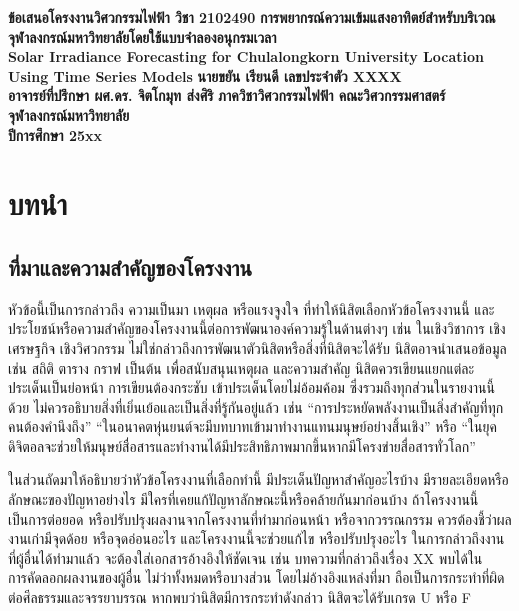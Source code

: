 \documentclass[11pt,a4paper]{article}
\begin{document}
\thispagestyle{empty}
\begin{center}
\doublespacing
{\LARGE \bf ข้อเสนอโครงงานวิศวกรรมไฟฟ้า วิชา 2102490}
\vfill
{ 
\LARGE \bf
การพยากรณ์ความเข้มแสงอาทิตย์สำหรับบริเวณจุฬาลงกรณ์มหาวิทยาลัยโดยใช้แบบจำลองอนุกรมเวลา \\[2ex]
Solar Irradiance Forecasting for Chulalongkorn University Location Using Time Series Models
}
\vfill
{\LARGE \bf นายขยัน เรียนดี เลขประจำตัว XXXX}\\[2ex]
{\LARGE \bf อาจารย์ที่ปรึกษา ผศ.ดร. จิตโกมุท ส่งศิริ}
\vfill
{\LARGE \bf ภาควิชาวิศวกรรมไฟฟ้า คณะวิศวกรรมศาสตร์}\\[2ex]
{\LARGE \bf จุฬาลงกรณ์มหาวิทยาลัย}\\[2ex]
{\LARGE \bf ปีการศึกษา 25xx}
\end{center}

\newpage
\thispagestyle{empty}
\tableofcontents

\newpage
\setcounter{page}{1}
\section{บทนำ}
\subsection{ที่มาและความสำคัญของโครงงาน}
หัวข้อนี้เป็นการกล่าวถึง ความเป็นมา เหตุผล หรือแรงจูงใจ ที่ทำให้นิสิตเลือกหัวข้อโครงงานนี้ และประโยชน์หรือความสำคัญของโครงงานนี้ต่อการพัฒนาองค์ความรู้ในด้านต่างๆ เช่น ในเชิงวิชาการ เชิงเศรษฐกิจ เชิงวิศวกรรม ไม่ใช่กล่าวถึงการพัฒนาตัวนิสิตหรือสิ่งที่นิสิตจะได้รับ นิสิตอาจนำเสนอข้อมูล เช่น สถิติ ตาราง กราฟ เป็นต้น เพื่อสนับสนุนเหตุผล และความสำคัญ นิสิตควรเขียนแยกแต่ละประเด็นเป็นย่อหน้า การเขียนต้องกระชับ เข้าประเด็นโดยไม่อ้อมค้อม ซึ่งรวมถึงทุกส่วนในรายงานนี้ด้วย ไม่ควรอธิบายสิ่งที่เยิ่นเย้อและเป็นสิ่งที่รู้กันอยู่แล้ว เช่น “การประหยัดพลังงานเป็นสิ่งสำคัญที่ทุกคนต้องคำนึงถึง” “ในอนาคตหุ่นยนต์จะมีบทบาทเข้ามาทำงานแทนมนุษย์อย่างสิ้นเชิง” หรือ “ในยุคดิจิตอลจะช่วยให้มนุษย์สื่อสารและทำงานได้มีประสิทธิภาพมากขึ้นหากมีโครงข่ายสื่อสารทั่วโลก”


ในส่วนถัดมาให้อธิบายว่าหัวข้อโครงงานที่เลือกทำนี้ มีประเด็นปัญหาสำคัญอะไรบ้าง มีรายละเอียดหรือลักษณะของปัญหาอย่างไร มีใครที่เคยแก้ปัญหาลักษณะนี้หรือคล้ายกันมาก่อนบ้าง ถ้าโครงงานนี้เป็นการต่อยอด หรือปรับปรุงผลงานจากโครงงานที่ทำมาก่อนหน้า หรือจากวรรณกรรม ควรต้องชี้ว่าผลงานเก่ามีจุดด้อย หรือจุดอ่อนอะไร และโครงงานนี้จะช่วยแก้ไข หรือปรับปรุงอะไร ในการกล่าวถึงงานที่ผู้อื่นได้ทำมาแล้ว จะต้องใส่เอกสารอ้างอิงให้ชัดเจน เช่น บทความที่กล่าวถึงเรื่อง XX พบได้ใน ~\cite{WaJ:08} การคัดลอกผลงานของผู้อื่น ไม่ว่าทั้งหมดหรือบางส่วน โดยไม่อ้างอิงแหล่งที่มา ถือเป็นการกระทำที่ผิดต่อศีลธรรมและจรรยาบรรณ หากพบว่านิสิตมีการกระทำดังกล่าว นิสิตจะได้รับเกรด U หรือ F
\end{document}
